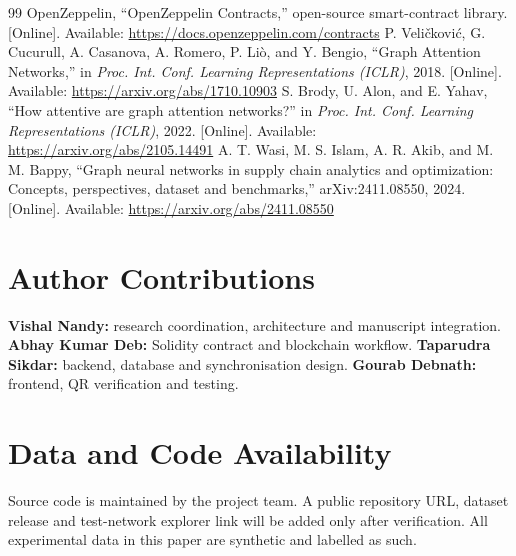 \documentclass[conference,a4paper]{IEEEtran}
\begin{document}
\begin{thebibliography}{99}
 OpenZeppelin, ``OpenZeppelin Contracts,'' open-source smart-contract library. [Online]. Available: \url{https://docs.openzeppelin.com/contracts}
 P. Veli{\v c}kovi{\'c}, G. Cucurull, A. Casanova, A. Romero, P. Li{\`o}, and Y. Bengio, ``Graph Attention Networks,'' in \textit{Proc. Int. Conf. Learning Representations (ICLR)}, 2018. [Online]. Available: \url{https://arxiv.org/abs/1710.10903}
 S. Brody, U. Alon, and E. Yahav, ``How attentive are graph attention networks?'' in \textit{Proc. Int. Conf. Learning Representations (ICLR)}, 2022. [Online]. Available: \url{https://arxiv.org/abs/2105.14491}
 A. T. Wasi, M. S. Islam, A. R. Akib, and M. M. Bappy, ``Graph neural networks in supply chain analytics and optimization: Concepts, perspectives, dataset and benchmarks,'' arXiv:2411.08550, 2024. [Online]. Available: \url{https://arxiv.org/abs/2411.08550}
\end{thebibliography}

\section*{Author Contributions}
\textbf{Vishal Nandy:} research coordination, architecture and manuscript integration. \textbf{Abhay Kumar Deb:} Solidity contract and blockchain workflow. \textbf{Taparudra Sikdar:} backend, database and synchronisation design. \textbf{Gourab Debnath:} frontend, QR verification and testing.

\section*{Data and Code Availability}
Source code is maintained by the project team. A public repository URL, dataset release and test-network explorer link will be added only after verification. All experimental data in this paper are synthetic and labelled as such.
\end{document}
